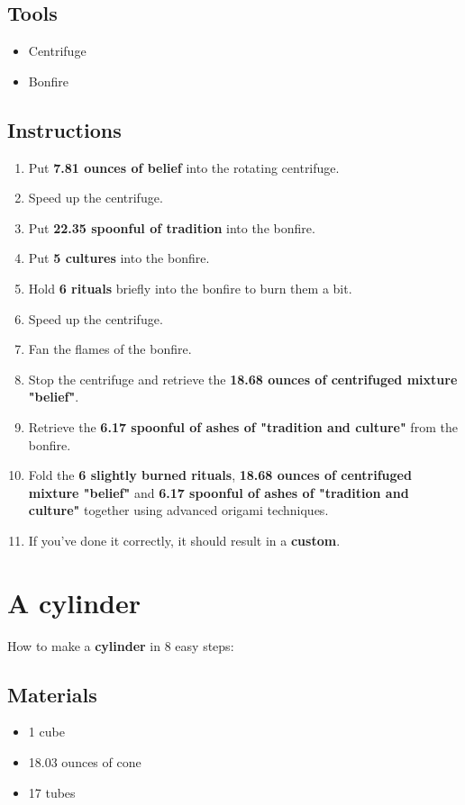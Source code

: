 \documentclass{article}
\begin{document}
\subsection{Tools}\begin{itemize}
\item 
Centrifuge
\item 
Bonfire
\end{itemize}
\subsection{Instructions}\begin{enumerate}
\item 
Put \textbf{7.81 ounces of belief} into the rotating centrifuge.
\item 
Speed up the centrifuge.
\item 
Put \textbf{22.35 spoonful of tradition} into the bonfire.
\item 
Put \textbf{5 cultures} into the bonfire.
\item 
Hold \textbf{6 rituals} briefly into the bonfire to burn them a bit.
\item 
Speed up the centrifuge.
\item 
Fan the flames of the bonfire.
\item 
Stop the centrifuge and retrieve the \textbf{18.68 ounces of centrifuged mixture "belief"}.
\item 
Retrieve the \textbf{6.17 spoonful of ashes of "tradition and culture"} from the bonfire.
\item 
Fold the \textbf{6 slightly burned rituals}, \textbf{18.68 ounces of centrifuged mixture "belief"} and \textbf{6.17 spoonful of ashes of "tradition and culture"} together using advanced origami techniques.
\item 
If you've done it correctly, it should result in a \textbf{custom}.
\end{enumerate}
\newpage
\section{A cylinder}How to make a \textbf{cylinder} in 8 easy steps:

\subsection{Materials}\begin{itemize}
\item 
1 cube
\item 
18.03 ounces of cone
\item 
17 tubes
\end{itemize}
\end{document}
